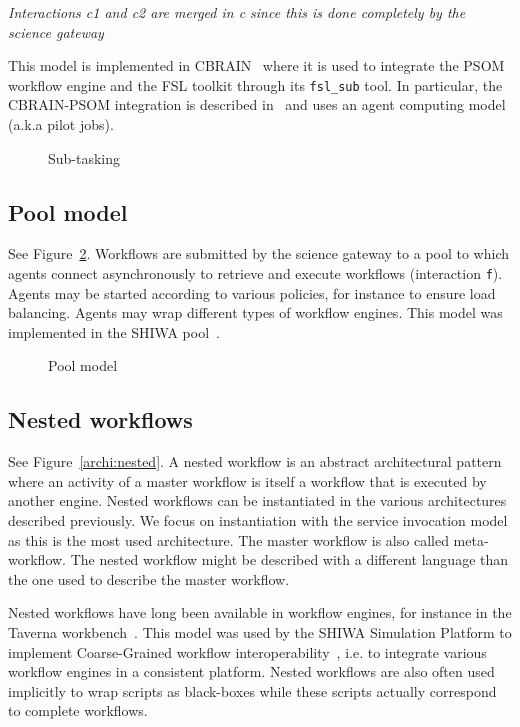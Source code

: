 \documentclass[preprint,3p,twocolumn]{elsarticle}
\newcommand{\todo}[1]{\color{blue}\xspace\emph{#1}\xspace\color{black}}
\begin{document}
\todo{Interactions c1 and c2 are merged in c since this is done
  completely by the science gateway}

This model is implemented in CBRAIN~\cite{SHER-14} where it is used to
integrate the PSOM workflow engine and the FSL toolkit through its
\texttt{fsl\_sub} tool. In particular, the CBRAIN-PSOM integration is
described in~\cite{GLAT-16} and uses an agent computing model (a.k.a pilot
jobs).
\begin{figure}
\centering
\def\svgwidth{0.5\columnwidth}

\caption{Sub-tasking}
\label{archi:sub-task}
\end{figure}

\subsection{Pool model}
\label{sec:pool}
See Figure~\ref{archi:agent}. Workflows are submitted by the science
gateway to a pool to which agents connect asynchronously to retrieve
and execute workflows (interaction \texttt{f}). Agents may be started according to various
policies, for instance to ensure load balancing. Agents may wrap
different types of workflow engines. This model was implemented in the
SHIWA pool~\cite{ROGE-13}.
\begin{figure}
\centering
\def\svgwidth{0.8\columnwidth}

\caption{Pool model}
\label{archi:agent}
\end{figure}

\subsection{Nested workflows}

See Figure~\ref{archi:nested}. A nested workflow is an abstract
architectural pattern where an activity of a master workflow is itself
a workflow that is executed by another engine. Nested workflows can be
instantiated in the various architectures described previously. We
focus on instantiation with the service invocation model as this is
the most used architecture. The master workflow is also called
meta-workflow. The nested workflow might be described with a different
language than the one used to describe the master workflow.

Nested workflows have long been available in workflow engines, for
instance in the Taverna workbench~\cite{oinn2004taverna}. This model
was used by the SHIWA Simulation Platform to implement Coarse-Grained
workflow interoperability~\cite{terstyanszky2014enabling}, i.e. to
integrate various workflow engines in a consistent platform. Nested
workflows are also often used implicitly to wrap scripts as
black-boxes while these scripts actually correspond to complete workflows.
\end{document}
